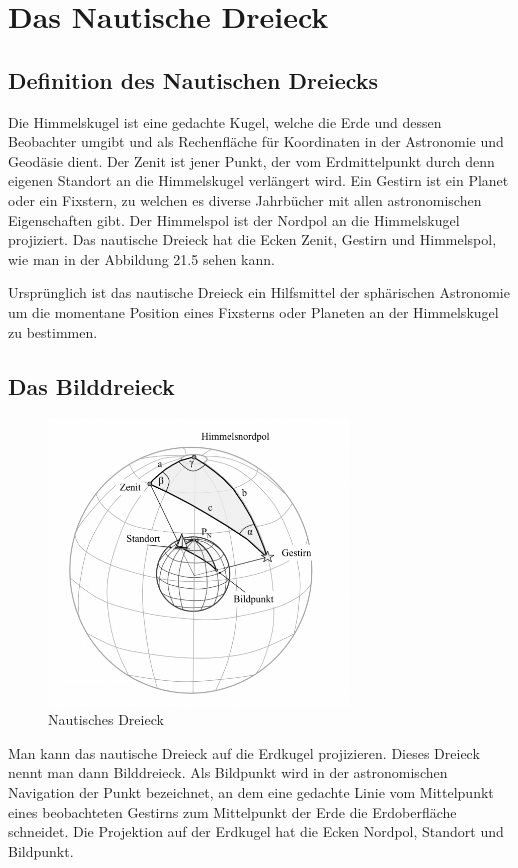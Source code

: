 \section{Das Nautische Dreieck}
\subsection{Definition des Nautischen Dreiecks}
Die Himmelskugel ist eine gedachte Kugel, welche die Erde und dessen Beobachter umgibt und als Rechenfläche für Koordinaten in der Astronomie und Geodäsie dient.
Der Zenit ist jener Punkt, der vom Erdmittelpunkt durch denn eigenen Standort an die Himmelskugel verlängert wird.
Ein Gestirn ist ein Planet oder ein Fixstern, zu welchen es diverse Jahrbücher mit allen astronomischen Eigenschaften gibt. 
Der Himmelspol ist der Nordpol an die Himmelskugel projiziert.
Das nautische Dreieck hat die Ecken Zenit, Gestirn und Himmelspol, wie man in der Abbildung 21.5 sehen kann.

Ursprünglich ist das nautische Dreieck ein Hilfsmittel der sphärischen Astronomie um die momentane Position eines Fixsterns oder Planeten an der Himmelskugel zu bestimmen. 

\subsection{Das Bilddreieck}
\begin{figure}
	\begin{center}
		\includegraphics[width=8cm]{papers/nav/bilder/kugel3.png}
		\caption[Nautisches Dreieck]{Nautisches Dreieck}
	\end{center}
\end{figure}
 Man kann das nautische Dreieck auf die Erdkugel projizieren.
Dieses Dreieck nennt man dann Bilddreieck. 
Als Bildpunkt wird in der astronomischen Navigation der Punkt bezeichnet, an dem eine gedachte Linie vom Mittelpunkt eines beobachteten Gestirns zum Mittelpunkt der Erde die Erdoberfläche schneidet. 
Die Projektion auf der Erdkugel hat die Ecken Nordpol, Standort und Bildpunkt.

